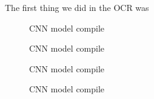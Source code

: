The first thing we did in the OCR was

\begin{figure}[h]
    \caption{CNN model compile}
    \label{fig:figure7}

\end{figure}

\begin{figure}[h]
    \caption{CNN model compile}
    \label{fig:figure8}

\end{figure}

\begin{figure}[h]
    \caption{CNN model compile}
    \label{fig:figure9}

\end{figure}

\begin{figure}[h]
    \caption{CNN model compile}
    \label{fig:figure10}
\end{figure}

